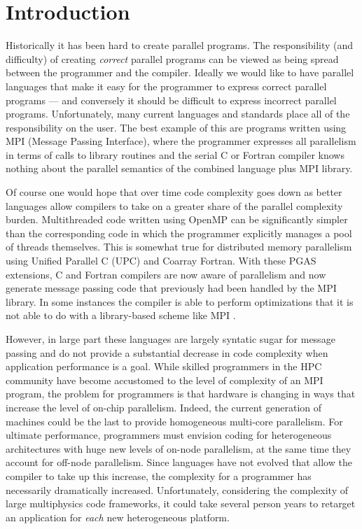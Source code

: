 \section{Introduction}

Historically it has been hard to create parallel programs.  The
responsibility (and difficulty) of creating \emph{correct} parallel
programs can be viewed as being spread between the programmer and the
compiler.  Ideally we would like to have parallel languages that make
it easy for the programmer to express correct parallel programs --- and
conversely it should be difficult to express incorrect parallel
programs.  Unfortunately, many current languages and standards place
all of the responsibility on the user.  The best example of this are
programs written using MPI (Message Passing Interface), where the
programmer expresses all parallelism in terms of calls to library
routines and the serial C or Fortran compiler knows nothing about the
parallel semantics of the combined language plus MPI library.

Of course one would hope that over time code complexity goes down as
better languages allow compilers to take on a greater share of the
parallel complexity burden.  Multithreaded code written using OpenMP
can be significantly simpler than the corresponding code in which the
programmer explicitly manages a pool of threads themselves.  This is
somewhat true for distributed memory parallelism using Unified
Parallel C (UPC) and Coarray Fortran.  With these PGAS extensions, C and
Fortran compilers are now aware of parallelism and now generate
message passing code that previously had been handled by the MPI
library.  In some instances the compiler is able to perform
optimizations that it is not able to do with a library-based scheme
like MPI \cite{preissl:2011:SC}.


However, in large part these languages are largely syntatic sugar for
message passing and do not provide a substantial decrease in code
complexity when application performance is a
goal\cite{hasert:2011:EuroMPI}.  While skilled programmers in the HPC
community have become accustomed to the level of complexity of an MPI
program, the problem for programmers is that hardware is changing in
ways that increase the level of on-chip parallelism.  Indeed, the
current generation of machines could be the last to provide
homogeneous multi-core parallelism\cite{JORSjors.aw}.  For ultimate
performance, programmers must envision coding for heterogeneous
architectures with huge new levels of on-node parallelism, at the same
time they account for off-node parallelism.
Since languages have not evolved that allow the compiler to take up
this increase, the complexity for a programmer has necessarily
dramatically increased.  Unfortunately, considering the complexity of
large multiphysics code frameworks, it could take several person years
to retarget an application for \emph{each} new heterogeneous
platform\cite{DBLP:journals/corr/DubeyS13}.

